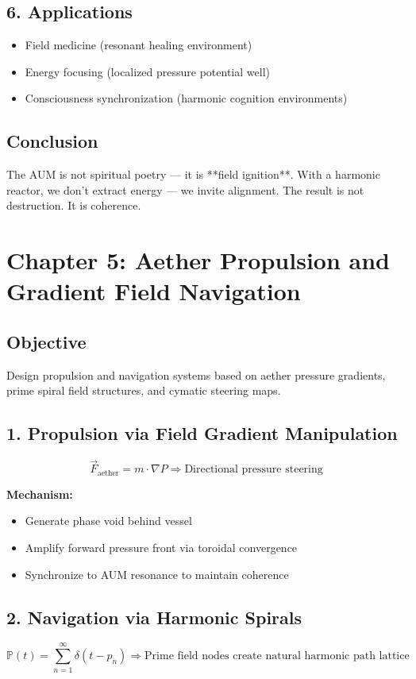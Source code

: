 \documentclass[12pt]{book}
\begin{document}
\subsection*{6. Applications}
\begin{itemize}
  \item Field medicine (resonant healing environment)
  \item Energy focusing (localized pressure potential well)
  \item Consciousness synchronization (harmonic cognition environments)
\end{itemize}

\subsection*{Conclusion}
The AUM is not spiritual poetry — it is **field ignition**. With a harmonic reactor, we don’t extract energy — we invite alignment. The result is not destruction. It is coherence.




\section*{Chapter 5: Aether Propulsion and Gradient Field Navigation}

\subsection*{Objective}
Design propulsion and navigation systems based on aether pressure gradients, prime spiral field structures, and cymatic steering maps.

\subsection*{1. Propulsion via Field Gradient Manipulation}
\[
\vec{F}_{\text{aether}} = m \cdot \nabla P
\Rightarrow \text{Directional pressure steering}
\]

\textbf{Mechanism:}
\begin{itemize}
  \item Generate phase void behind vessel
  \item Amplify forward pressure front via toroidal convergence
  \item Synchronize to AUM resonance to maintain coherence
\end{itemize}

\subsection*{2. Navigation via Harmonic Spirals}
\[
\mathbb{P}(t) = \sum_{n=1}^{\infty} \delta(t - p_n)
\Rightarrow \text{Prime field nodes create natural harmonic path lattice}
\]
\end{document}
